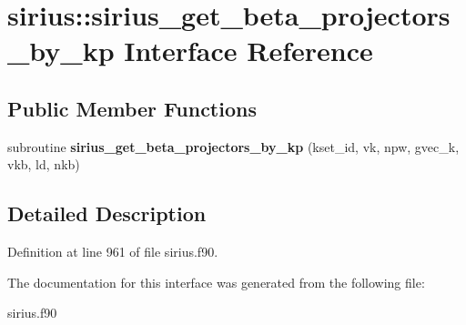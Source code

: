 \hypertarget{interfacesirius_1_1sirius__get__beta__projectors__by__kp}{}\section{sirius\+:\+:sirius\+\_\+get\+\_\+beta\+\_\+projectors\+\_\+by\+\_\+kp Interface Reference}
\label{interfacesirius_1_1sirius__get__beta__projectors__by__kp}
\subsection*{Public Member Functions}
\begin{DoxyCompactItemize}
\item 
\hypertarget{interfacesirius_1_1sirius__get__beta__projectors__by__kp_a25e43c1845b5b9410490f2db680d2174}{}subroutine {\bfseries sirius\+\_\+get\+\_\+beta\+\_\+projectors\+\_\+by\+\_\+kp} (kset\+\_\+id, vk, npw, gvec\+\_\+k, vkb, ld, nkb)\label{interfacesirius_1_1sirius__get__beta__projectors__by__kp_a25e43c1845b5b9410490f2db680d2174}

\end{DoxyCompactItemize}


\subsection{Detailed Description}


Definition at line 961 of file sirius.\+f90.



The documentation for this interface was generated from the following file\+:\begin{DoxyCompactItemize}
\item 
sirius.\+f90\end{DoxyCompactItemize}
